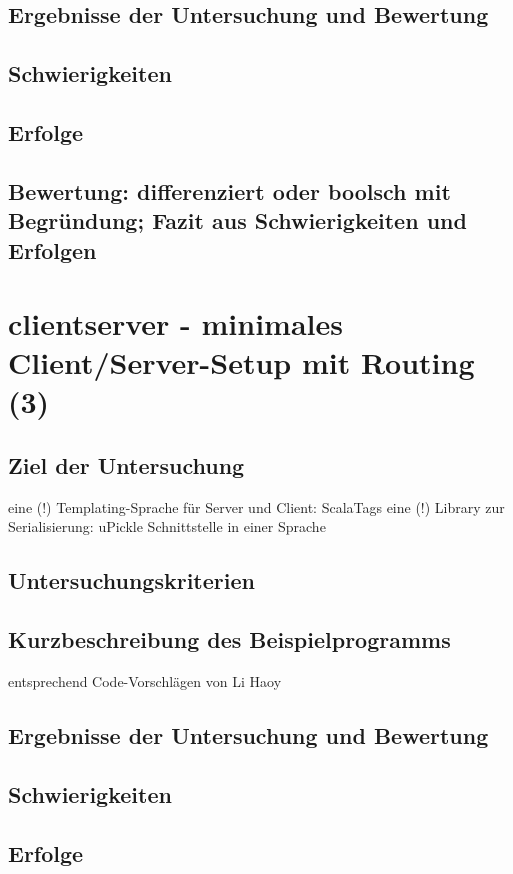 \documentclass[a4paper, 12pt, hidelinks, listof=totoc, listoftables=totoc, bibliography=totoc]{scrreprt}
\begin{document}
\subsection{Ergebnisse der Untersuchung und Bewertung}
\subsection{Schwierigkeiten}
\subsection{Erfolge}
\subsection{Bewertung: differenziert oder boolsch mit Begründung; Fazit aus Schwierigkeiten und Erfolgen}

\section{clientserver - minimales Client/Server-Setup mit Routing (3)}


\subsection{Ziel der Untersuchung}
eine (!) Templating-Sprache für Server und Client: ScalaTags \cite{haoyi.HOS}
eine (!) Library zur Serialisierung: uPickle \cite{haoyi.HOS}
Schnittstelle in einer Sprache

\subsection{Untersuchungskriterien}
\subsection{Kurzbeschreibung des Beispielprogramms}
entsprechend Code-Vorschlägen von Li Haoy\cite{haoyi.HOS}
\subsection{Ergebnisse der Untersuchung und Bewertung}
\subsection{Schwierigkeiten}
\subsection{Erfolge}
\end{document}
